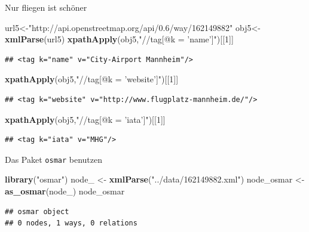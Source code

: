 \documentclass[ignorenonframetext,]{beamer}
\newenvironment{Shaded}{\begin{snugshade}}{\end{snugshade}}
\newcommand{\KeywordTok}[1]{\textcolor[rgb]{0.13,0.29,0.53}{\textbf{#1}}}
\newcommand{\DecValTok}[1]{\textcolor[rgb]{0.00,0.00,0.81}{#1}}
\newcommand{\StringTok}[1]{\textcolor[rgb]{0.31,0.60,0.02}{#1}}
\newcommand{\NormalTok}[1]{#1}
\begin{document}
\begin{frame}[fragile]{Nur fliegen ist schöner}

\begin{Shaded}
\begin{Highlighting}[]
\NormalTok{url5<-}\StringTok{"http://api.openstreetmap.org/api/0.6/way/162149882"}
\NormalTok{obj5<-}\KeywordTok{xmlParse}\NormalTok{(url5)}
\KeywordTok{xpathApply}\NormalTok{(obj5,}\StringTok{"//tag[@k = 'name']"}\NormalTok{)[[}\DecValTok{1}\NormalTok{]]}
\end{Highlighting}
\end{Shaded}

\begin{verbatim}
## <tag k="name" v="City-Airport Mannheim"/>
\end{verbatim}

\begin{Shaded}
\begin{Highlighting}[]
\KeywordTok{xpathApply}\NormalTok{(obj5,}\StringTok{"//tag[@k = 'website']"}\NormalTok{)[[}\DecValTok{1}\NormalTok{]]}
\end{Highlighting}
\end{Shaded}

\begin{verbatim}
## <tag k="website" v="http://www.flugplatz-mannheim.de/"/>
\end{verbatim}

\begin{Shaded}
\begin{Highlighting}[]
\KeywordTok{xpathApply}\NormalTok{(obj5,}\StringTok{"//tag[@k = 'iata']"}\NormalTok{)[[}\DecValTok{1}\NormalTok{]]}
\end{Highlighting}
\end{Shaded}

\begin{verbatim}
## <tag k="iata" v="MHG"/>
\end{verbatim}

\end{frame}

\begin{frame}[fragile]{Das Paket \texttt{osmar} benutzen}

\begin{Shaded}
\begin{Highlighting}[]
\KeywordTok{library}\NormalTok{(}\StringTok{"osmar"}\NormalTok{)}
\NormalTok{node_ <-}\StringTok{ }\KeywordTok{xmlParse}\NormalTok{(}\StringTok{"../data/162149882.xml"}\NormalTok{)}
\NormalTok{node_osmar <-}\StringTok{ }\KeywordTok{as_osmar}\NormalTok{(node_)}
\NormalTok{node_osmar}
\end{Highlighting}
\end{Shaded}

\begin{verbatim}
## osmar object
## 0 nodes, 1 ways, 0 relations
\end{verbatim}

\end{frame}
\end{document}
